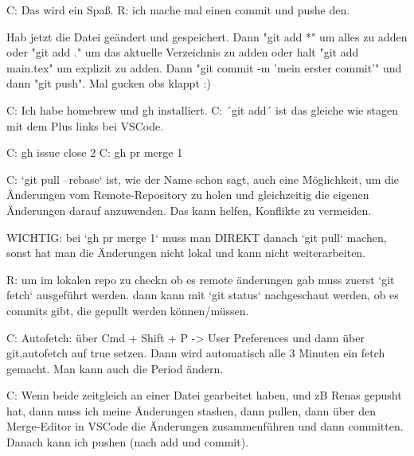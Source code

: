 C: Das wird ein Spaß.
R: ich mache mal einen commit und pushe den.

Hab jetzt die Datei geändert und gespeichert. Dann "git add *" um alles zu adden oder "git add ." um das aktuelle Verzeichnis zu adden oder halt "git add main.tex" um explizit zu adden.
Dann "git commit -m 'mein erster commit'" und dann "git push". Mal gucken obs klappt :)

C: Ich habe homebrew und gh installiert.
C: ´git add´ ist das gleiche wie stagen mit dem Plus links bei VSCode.

C: gh issue close 2
C: gh pr merge 1

C: `git pull --rebase` ist, wie der Name schon sagt, auch eine Möglichkeit, um die Änderungen vom Remote-Repository zu holen und gleichzeitig die eigenen Änderungen darauf anzuwenden. Das kann helfen, Konflikte zu vermeiden. 

WICHTIG: bei `gh pr merge 1` muss man DIREKT danach `git pull` machen, sonst hat man die Änderungen nicht lokal und kann nicht weiterarbeiten.

R: um im lokalen repo zu checkn ob es remote änderungen gab muss zuerst `git fetch` ausgeführt werden. dann kann mit `git status` nachgeschaut werden, ob es commits gibt, die gepullt werden können/müssen.

C: Autofetch: über Cmd + Shift + P -> User Preferences und dann über git.autofetch auf true setzen. Dann wird automatisch alle 3 Minuten ein fetch gemacht. Man kann auch die Period ändern.

C: Wenn beide zeitgleich an einer Datei gearbeitet haben, und zB Renas gepusht hat, dann muss ich meine Änderungen stashen, dann pullen, dann über den Merge-Editor in VSCode die Änderungen zusammenführen und dann committen. Danach kann ich pushen (nach add und commit).